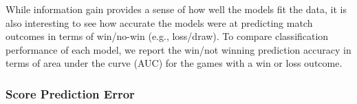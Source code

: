 While information gain provides a sense of how well the models fit the
data, it is also interesting to see how accurate the models were at
predicting match outcomes in terms of win/no-win (e.g., loss/draw).  To compare
classification performance of each model, we report the
win/not winning prediction accuracy in terms of area under the curve (AUC) for the
games with a win or loss outcome.



\subsubsection{Score Prediction Error}
\label{sec:scorePredictionError}





